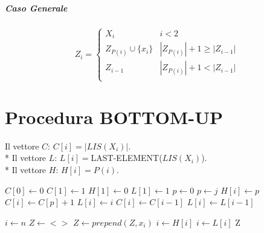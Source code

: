 \subparagraph{Caso Generale}

\[
    Z_i =
    \begin{cases}
        \text{$X_i$} & \text{$i < 2$} \\
        \text{$Z_{P(i)} \cup \{x_i\}$} & \text{$|Z_{P(i)}| + 1 \geq |Z_{i-1}|$} \\
        \text{$Z_{i-1}$} & \text{$|Z_{P(i)}| + 1 < |Z_{i-1}|$} \\
    \end{cases}
\]

\newpage

\section{Procedura BOTTOM-UP}

Il vettore $C$: $C[i] = |LIS(X_i)|$. \\*
Il vettore $L$: $L[i] = $LAST-ELEMENT($LIS(X_i)$). \\*
Il vettore $H$: $H[i] = P(i)$. \\

\begin{algorithm}
    \begin{algorithmic}
            \State $C[0] \gets 0$
            \State $C[1] \gets 1$
            \State $H[1] \gets 0$
            \State $L[1] \gets 1$
                \State $p \gets 0$
                        \State $p \gets j$
                    \EndIf
                \EndFor
                \State $H[i] \gets p$
                    \State $C[i] \gets C[p] + 1$
                    \State $L[i] \gets i$
                \Else
                    \State $C[i] \gets C[i-1]$
                    \State $L[i] \gets L[i-1]$
                \EndIf
            \EndFor
        \EndProcedure
    \end{algorithmic}
\end{algorithm}

\begin{algorithm}
    \begin{algorithmic}
            \State $i \gets n$
            \State $Z \gets <>$
                    \State $Z \gets prepend(Z, x_i)$
                    \State $i \gets H[i]$
                \Else
                    \State $i \gets L[i]$
                \EndIf
            \EndWhile
            \State \Return Z
        \EndProcedure
    \end{algorithmic}
\end{algorithm}

